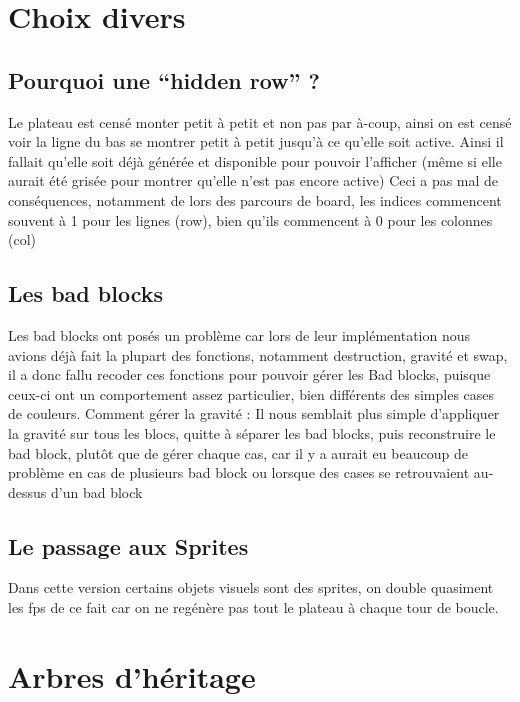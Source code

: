 \documentclass[]{article}
\begin{document}
\pagebreak
\section*{Choix divers}
\subsection*{Pourquoi une ``hidden row'' ?}

Le plateau est censé monter petit à petit et non pas par à-coup, ainsi on est censé voir la ligne du bas
se montrer petit à petit jusqu’à ce qu’elle soit active. Ainsi il fallait qu’elle soit déjà générée et
disponible pour pouvoir l’afficher (même si elle aurait été grisée pour montrer qu’elle n’est pas
encore active)
Ceci a pas mal de conséquences, notamment de lors des parcours de board, les indices commencent
souvent à 1 pour les lignes (row), bien qu’ils commencent à 0 pour les colonnes (col)

\subsection*{Les bad blocks}
Les bad blocks ont posés un problème car lors de leur implémentation nous avions déjà fait la plupart
des fonctions, notamment destruction, gravité et swap, il a donc fallu recoder ces fonctions pour
pouvoir gérer les Bad blocks, puisque ceux-ci ont un comportement assez particulier, bien différents
des simples cases de couleurs.
Comment gérer la gravité :
Il nous semblait plus simple d’appliquer la gravité sur tous les blocs, quitte à séparer les bad blocks,
puis reconstruire le bad block, plutôt que de gérer chaque cas, car il y a aurait eu beaucoup de
problème en cas de plusieurs bad block ou lorsque des cases se retrouvaient au-dessus d’un bad
block
\subsection*{Le passage aux Sprites}
Dans cette version certains objets visuels sont des sprites, on double quasiment les fps de ce fait car on ne regénère
pas tout le plateau à chaque tour de boucle.

\section*{Arbres d'héritage}
\end{document}
